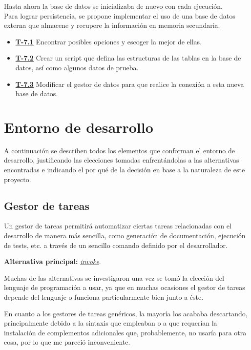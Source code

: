 \begin{itemize}
    Hasta ahora la base de datos se inicializaba de nuevo con cada ejecución. \\
    Para lograr persistencia, se propone implementar el uso de una base de datos externa que almacene y recupere la información en memoria secundaria.
    \begin{itemize}
        \item \href{https://github.com/Anglepi/My-Many-Reads/issues/77}{\textbf{T-7.1}} Encontrar posibles opciones y escoger la mejor de ellas.
        \item \href{https://github.com/Anglepi/My-Many-Reads/issues/78}{\textbf{T-7.2}} Crear un script que defina las estructuras de las tablas en la base de datos, así como algunos datos de prueba.
        \item \href{https://github.com/Anglepi/My-Many-Reads/issues/79}{\textbf{T-7.3}} Modificar el gestor de datos para que realice la conexión a esta nueva base de datos.
    \end{itemize}
\end{itemize}

\section{Entorno de desarrollo}

A continuación se describen todos los elementos que conforman el entorno de desarrollo, justificando las elecciones tomadas enfrentándolas a las alternativas encontradas e indicando el por qué de la decisión en base a la naturaleza de este proyecto.

\subsection{Gestor de tareas}

Un gestor de tareas permitirá automatizar ciertas tareas relacionadas con el desarrollo de manera más sencilla, como generación de documentación, ejecución de tests, etc. a través de un sencillo comando definido por el desarrollador.


\textbf{Alternativa principal:} \href{https://www.pyinvoke.org/}{\textit{invoke}}.

Muchas de las alternativas se investigaron una vez se tomó la elección del lenguaje de programación a usar, ya que en muchas ocasiones el gestor de tareas depende del lenguaje o funciona particularmente bien junto a éste. 

En cuanto a los gestores de tareas genéricos, la mayoría los acababa descartando, principalmente debido a la sintaxis que empleaban o a que requerían la instalación de complementos adicionales que, probablemente, no usaría para otra cosa, por lo que me pareció inconveniente.

